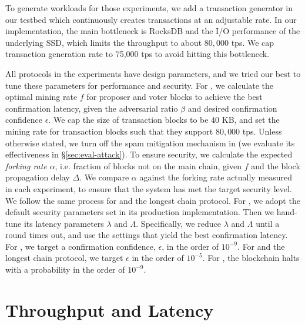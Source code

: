 To generate workloads for those experiments, we add a transaction generator in our testbed which continuously creates transactions at an adjustable rate. In our \prism implementation, the main bottleneck is RocksDB and the I/O performance of the underlying SSD, which limits the throughput to about $80,000$ tps. 
We cap transaction generation rate to 75,000 tps to avoid hitting this bottleneck.


{} All protocols in the experiments have design parameters, and we tried our best to tune these parameters for performance and security. For \prism, we calculate the optimal mining rate $f$ for proposer and voter blocks to achieve the best confirmation latency, given the adversarial ratio $\beta$ and desired confirmation confidence $\epsilon$. We cap the size of transaction blocks to be 40 KB, and set the mining rate for transaction blocks such that they support $80,000$ tps. Unless otherwise stated, we turn off the spam mitigation mechanism in \prism (we evaluate its effectiveness in \S\ref{sec:eval-attack}).  To ensure security, we calculate the expected {\em forking rate} $\alpha$, i.e. fraction of blocks not on the main chain, given $f$ and the block propagation delay $\Delta$. We compare $\alpha$ against the forking rate actually measured in each experiment, to ensure that the system has met the target security level. We follow the same process for \bng and the longest chain protocol. For \algorand, we adopt the default security parameters set in its production implementation. Then we hand-tune its latency parameters $\lambda$ and $\Lambda$. Specifically, we reduce $\lambda$ and $\Lambda$ until a round times out, and use the settings that yield the best confirmation latency. For \prism, we target a confirmation confidence, $\epsilon$, in the order of $10^{-9}$. For \bng and the longest chain protocol, we target $\epsilon$ in the order of $10^{-5}$. For \algorand, the blockchain halts with a probability in the order of $10^{-9}$.

\section{Throughput and Latency}
\label{sec:eval-performance}

